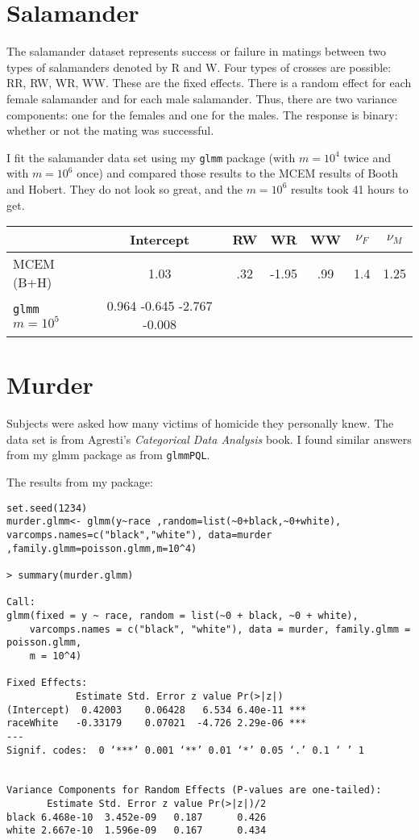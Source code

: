 \documentclass{article}
\begin{document}
\section{Salamander}
The salamander dataset represents success or failure in matings between two types of salamanders denoted by R and W. Four types of crosses are possible: RR, RW, WR, WW. These are the fixed effects. There is a random effect for each female salamander and for each male salamander. Thus, there are two variance components: one for the females and one for the males. The response is binary: whether or not the mating was successful.

I fit the salamander data set using  my \texttt{glmm} package (with $m=10^4$ twice and with $m=10^6$ once)  and compared those results to the MCEM results of Booth and Hobert. They do not look so great, and the $m=10^6$ results took 41 hours to get.

\begin{tabular}{lcccccc}
& Intercept & RW & WR & WW & $\nu_F$ & $\nu_M$ \\ \hline
MCEM (B+H) & 1.03 & .32 & -1.95 & .99 & 1.4 & 1.25 \\
\texttt{glmm} $m=10^5$ &   0.964      -0.645      -2.767      -0.008
\end{tabular}









\section{Murder}
Subjects were asked how many victims of homicide they personally knew. The data set is from Agresti's \textit{Categorical Data Analysis} book. I found similar answers from my glmm package as from \texttt{glmmPQL}.

The results from my package:

\begin{verbatim}
set.seed(1234)
murder.glmm<- glmm(y~race ,random=list(~0+black,~0+white), varcomps.names=c("black","white"), data=murder ,family.glmm=poisson.glmm,m=10^4)

> summary(murder.glmm)

Call:
glmm(fixed = y ~ race, random = list(~0 + black, ~0 + white), 
    varcomps.names = c("black", "white"), data = murder, family.glmm = poisson.glmm, 
    m = 10^4)

Fixed Effects:
            Estimate Std. Error z value Pr(>|z|)    
(Intercept)  0.42003    0.06428   6.534 6.40e-11 ***
raceWhite   -0.33179    0.07021  -4.726 2.29e-06 ***
---
Signif. codes:  0 ‘***’ 0.001 ‘**’ 0.01 ‘*’ 0.05 ‘.’ 0.1 ‘ ’ 1


Variance Components for Random Effects (P-values are one-tailed):
       Estimate Std. Error z value Pr(>|z|)/2
black 6.468e-10  3.452e-09   0.187      0.426
white 2.667e-10  1.596e-09   0.167      0.434
\end{verbatim}
\end{document}
